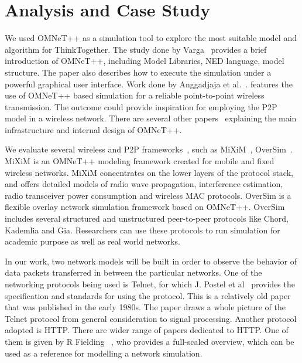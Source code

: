 \section{Analysis and Case Study}
We used OMNeT++ as a simulation tool to explore the most
suitable model and algorithm for ThinkTogether. The study done by
Varga~\cite{A_OMNET_ESM01}
provides a brief introduction of OMNeT++, including Model Libraries, NED
language,
model structure. The paper also describes how to execute the simulation under a
powerful graphical user interface. Work done by Anggadjaja et
al.~\cite{EI_OMNET_ACT10}. features the
use of OMNeT++ based
simulation for a reliable point-to-point wireless transmission. The outcome could
provide inspiration for employing the P2P model in a wireless network. There
are several other papers~\cite{MM_OMNET_OMN08,XX_OMNET_ICQ12} explaining the
main infrastructure and
internal
design of OMNeT++.

We evaluate several wireless and P2P frameworks~\cite{FBP_P2POVERLAY03},
such as MiXiM~\cite{XLL_MIXIM11}, OverSim~\cite{IBS_OVERSIM07}.
MiXiM is an OMNeT++ modeling framework created for mobile and fixed wireless
networks. MiXiM concentrates on the lower layers of the protocol stack, and offers
detailed models of radio wave propagation, interference estimation, radio transceiver
power consumption and wireless MAC protocols. OverSim is a flexible overlay network
simulation framework based on OMNeT++. OverSim includes several structured and
unstructured peer-to-peer protocols like Chord, Kademlia and Gia. Researchers can use
these protocols to run simulation for academic purpose as well as real world networks.

In our work, two network models will be built in order to observe the behavior
of data packets transferred in between the particular networks. One of the networking protocols
being used is Telnet, for which J. Postel et al~\cite{JJ_TEL83} provides the specification and
standards for using the protocol. This is a relatively old paper that was published in the early 1980s. The
paper draws a whole picture of the Telnet protocol from general consideration to
signal processing. Another protocol adopted is HTTP. There are wider
range of papers dedicated to HTTP. One of them is given by R Fielding~\cite{BJJH_HTTP1999}
, who provides a full-scaled overview, which can be used as a reference for modelling a network simulation.

